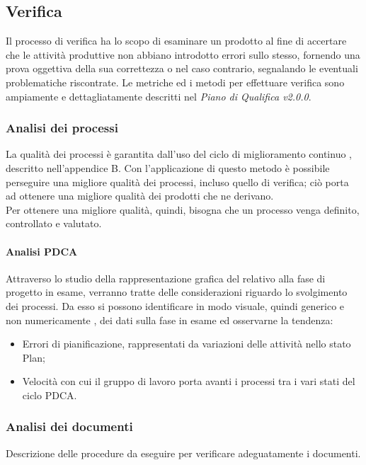 \subsection{Verifica}
Il processo di verifica ha lo scopo di esaminare un prodotto al fine di accertare che le attività produttive non abbiano introdotto errori sullo stesso, fornendo una prova oggettiva della sua correttezza o nel caso contrario, segnalando le eventuali problematiche riscontrate. Le metriche ed i metodi per effettuare verifica sono ampiamente e dettagliatamente descritti nel \emph{Piano di Qualifica v2.0.0}.

\subsubsection{Analisi dei processi}
La qualità dei processi è garantita dall'uso del ciclo di miglioramento continuo , descritto nell'appendice B. Con l'applicazione di questo metodo è possibile perseguire una migliore qualità dei processi, incluso quello di verifica; ciò porta ad ottenere una migliore qualità dei prodotti che ne derivano. \\
Per ottenere una migliore qualità, quindi, bisogna che un processo venga definito, controllato e valutato.

\paragraph{Analisi PDCA} \Spazio
Attraverso lo studio della rappresentazione grafica del  relativo alla fase di progetto in esame, verranno tratte delle considerazioni riguardo lo svolgimento dei processi.
Da esso si possono identificare in modo visuale, quindi generico e non numericamente , dei dati sulla fase in esame ed osservarne la tendenza:
\begin{itemize}
	\item Errori di pianificazione, rappresentati da variazioni delle attività nello stato
	Plan;
	\item Velocità con cui il gruppo di lavoro porta avanti i processi tra i vari stati del
	ciclo PDCA.
\end{itemize}


\subsubsection{Analisi dei documenti}
 Descrizione delle procedure da eseguire per verificare adeguatamente i documenti.

